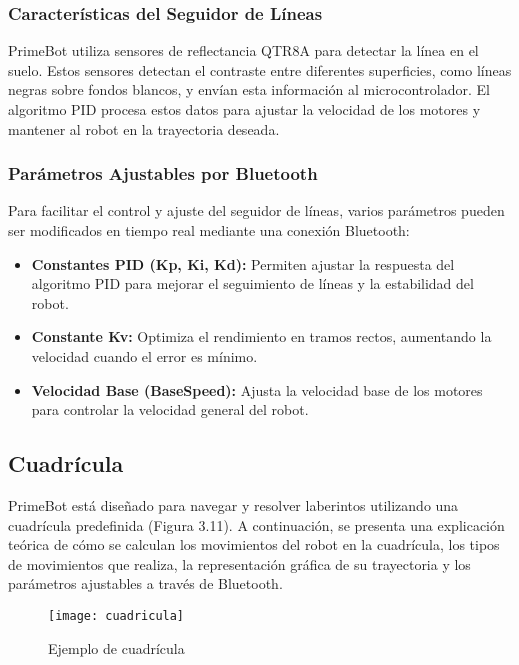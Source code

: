 \subsubsection{Características del Seguidor de Líneas}\label{caracteristicas-seguidor-lineas}

PrimeBot utiliza sensores de reflectancia QTR8A para detectar la línea en el suelo. Estos sensores detectan el contraste entre diferentes superficies, como líneas negras sobre fondos blancos, y envían esta información al microcontrolador. El algoritmo PID procesa estos datos para ajustar la velocidad de los motores y mantener al robot en la trayectoria deseada.

\subsubsection{Parámetros Ajustables por Bluetooth}

Para facilitar el control y ajuste del seguidor de líneas, varios parámetros pueden ser modificados en tiempo real mediante una conexión Bluetooth:
\begin{itemize}
\item \textbf{Constantes PID (Kp, Ki, Kd):} Permiten ajustar la respuesta del algoritmo PID para mejorar el seguimiento de líneas y la estabilidad del robot.
\item \textbf{Constante Kv:} Optimiza el rendimiento en tramos rectos, aumentando la velocidad cuando el error es mínimo.
\item \textbf{Velocidad Base (BaseSpeed):} Ajusta la velocidad base de los motores para controlar la velocidad general del robot.
\end{itemize}

\subsection{Cuadrícula}\label{cuadricula}

PrimeBot está diseñado para navegar y resolver laberintos utilizando una cuadrícula predefinida (Figura 3.11). A continuación, se presenta una explicación teórica de cómo se calculan los movimientos del robot en la cuadrícula, los tipos de movimientos que realiza, la representación gráfica de su trayectoria y los parámetros ajustables a través de Bluetooth.

\begin{figure}[h]
	\centering
	\texttt{[image: cuadricula]}
	\caption{Ejemplo de cuadrícula}
	\label{fig:3.11}
\end{figure}

